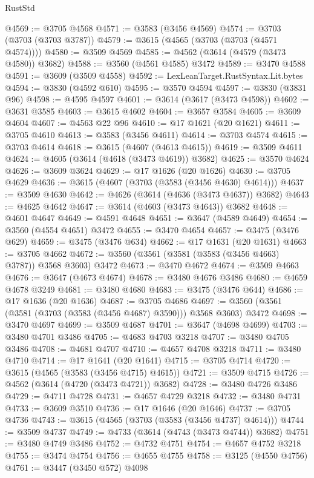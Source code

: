 \begin{lexlean}{RustStd}
\begin{coremodule}
{\begin{coremodule}
{{{{{{{{{{{{{{{{{{{{{{{{{{{{{{{{{{{{{{{{{{{{{@4569 := @3705 @4568
@4571 := @3583 (@3456 @4569)
@4574 := @3703 (@3703 (@3703 @3787))
@4579 := @3615 (@4565 (@3703 (@3703 (@4571 @4574))))
@4580 := @3509 @4569
@4585 := @4562 (@3614 (@4579 (@3473 @4580)) @3682)
@4588 := @3560 (@4561 @4585) @3472
@4589 := @3470 @4588
@4591 := @3609 (@3509 @4558)
@4592 := LexLeanTarget.RustSyntax.Lit.bytes
@4594 := @3830 (@4592 @610)
@4595 := @3570 @4594
@4597 := @3830 (@3831 @96)
@4598 := @4595 @4597
@4601 := @3614 (@3617 (@3473 @4598))
@4602 := @3631 @3585
@4603 := @3615 @4602
@4604 := @3657 @3584
@4605 := @3609 @4604
@4607 := @4563 @22 @96
@4610 := @17 @1621 (@20 @1621)
@4611 := @3705 @4610
@4613 := @3583 (@3456 @4611)
@4614 := @3703 @4574
@4615 := @3703 @4614
@4618 := @3615 (@4607 (@4613 @4615))
@4619 := @3509 @4611
@4624 := @4605 (@3614 (@4618 (@3473 @4619)) @3682)
@4625 := @3570 @4624
@4626 := @3609 @3624
@4629 := @17 @1626 (@20 @1626)
@4630 := @3705 @4629
@4636 := @3615 (@4607 (@3703 (@3583 (@3456 @4630) @4614)))
@4637 := @3509 @4630
@4642 := @4626 (@3614 (@4636 (@3473 @4637)) @3682)
@4643 := @4625 @4642
@4647 := @3614 (@4603 (@3473 @4643)) @3682
@4648 := @4601 @4647
@4649 := @4591 @4648
@4651 := @3647 (@4589 @4649)
@4654 := @3560 (@4554 @4651) @3472
@4655 := @3470 @4654
@4657 := @3475 (@3476 @629)
@4659 := @3475 (@3476 @634)
@4662 := @17 @1631 (@20 @1631)
@4663 := @3705 @4662
@4672 := @3560 (@3561 (@3581 (@3583 (@3456 @4663) @3787)) @3568 @3603) @3472
@4673 := @3470 @4672
@4674 := @3509 @4663
@4676 := @3647 (@4673 @4674)
@4678 := @3480 @4676 @3486
@4680 := @4659 @4678 @3249
@4681 := @3480 @4680
@4683 := @3475 (@3476 @644)
@4686 := @17 @1636 (@20 @1636)
@4687 := @3705 @4686
@4697 := @3560 (@3561 (@3581 (@3703 (@3583 (@3456 @4687) @3590))) @3568 @3603) @3472
@4698 := @3470 @4697
@4699 := @3509 @4687
@4701 := @3647 (@4698 @4699)
@4703 := @3480 @4701 @3486
@4705 := @4683 @4703 @3218
@4707 := @3480 @4705 @3486
@4708 := @4681 @4707
@4710 := @4657 @4708 @3218
@4711 := @3480 @4710
@4714 := @17 @1641 (@20 @1641)
@4715 := @3705 @4714
@4720 := @3615 (@4565 (@3583 (@3456 @4715) @4615))
@4721 := @3509 @4715
@4726 := @4562 (@3614 (@4720 (@3473 @4721)) @3682)
@4728 := @3480 @4726 @3486
@4729 := @4711 @4728
@4731 := @4657 @4729 @3218
@4732 := @3480 @4731
@4733 := @3609 @3510
@4736 := @17 @1646 (@20 @1646)
@4737 := @3705 @4736
@4743 := @3615 (@4565 (@3703 (@3583 (@3456 @4737) @4614)))
@4744 := @3509 @4737
@4749 := @4733 (@3614 (@4743 (@3473 @4744)) @3682)
@4751 := @3480 @4749 @3486
@4752 := @4732 @4751
@4754 := @4657 @4752 @3218
@4755 := @3474 @4754
@4756 := @4655 @4755
@4758 := @3125 (@4550 @4756)
@4761 := @3447 (@3450 @572) @4098
}}}}}}}}}}}}}}}}}}}}}}}}}}}}}}}}}}}}}}}}}}}}}
\end{coremodule}}
\end{coremodule}
\end{lexlean}
